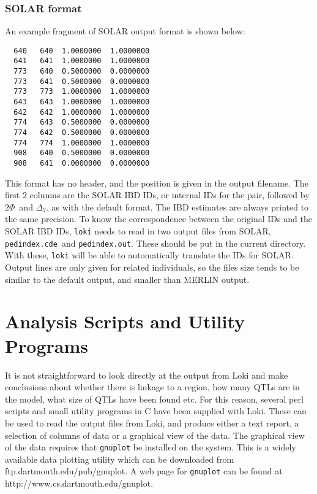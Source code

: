 \documentclass[10pt,a4paper]{article}
\newcommand{\Loki}{\texttt{loki}\xspace}
\begin{document}
\subsubsection{SOLAR format}
An example fragment of SOLAR output format is shown below:
\begin{verbatim}
  640   640  1.0000000  1.0000000
  641   641  1.0000000  1.0000000
  773   640  0.5000000  0.0000000
  773   641  0.5000000  0.0000000
  773   773  1.0000000  1.0000000
  643   643  1.0000000  1.0000000
  642   642  1.0000000  1.0000000
  774   643  0.5000000  0.0000000
  774   642  0.5000000  0.0000000
  774   774  1.0000000  1.0000000
  908   640  0.5000000  0.0000000
  908   641  0.0000000  0.0000000
\end{verbatim}
This format has no header, and the position is given in the output filename.
The first 2 columns are the SOLAR IBD IDs, or internal IDs for the pair,
followed by $2\Phi$\ and $\Delta_7$, as with the default format.  The IBD
estimates are always printed to the same precision.  To know the
correspondence between the original IDs and the SOLAR IBD IDs, \Loki needs to
read in two output files from SOLAR, \verb+pedindex.cde+\ and
\verb+pedindex.out+.  These should be put in the current directory.  With
these, \Loki will be able to automatically translate the IDs for SOLAR.
Output lines are only given for related individuals, so the files size tends
to be similar to the default output, and smaller than MERLIN output.
\section{Analysis Scripts and Utility Programs}
\label{scripts}
It is not straightforward to look directly at the output from Loki and make
conclusions about whether there is linkage to a region, how many QTLs are in
the model, what size of QTLs have been found etc.  For this reason, several
perl scripts and small utility programs in C have been supplied with Loki.
These can be used to read the output files from Loki, and produce
either a text report, a selection of columns of data or a graphical view of
the data.  The graphical view of the data requires that \verb+gnuplot+ be installed
on the system.  This is a widely available data plotting utility which
can be downloaded from ftp.dartmouth.edu/pub/gnuplot.  A web page for
\verb+gnuplot+ can be found at http://www.cs.dartmouth.edu/gnuplot.
\end{document}
